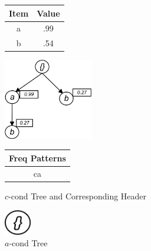 \begin{figure}
\begin{minipage}{0.15\textwidth}
  \centering
	\begin{center}
	\begin{tabular}{ |c|c| } 
 	\hline
 		Item&Value\\ \hline\hline
 		a &  .99  	\\ \hline
 		b &  .54   	\\ \hline
\end{tabular}
\end{center}  
\end{minipage}
  \hfill
\begin{minipage}{0.14\textwidth}
  \centering
  \hfill
  \includegraphics[width=.8\textwidth, height=3.5cm]{images/C_COND.jpg}
  \hfill  
\end{minipage}
\hfill
\begin{minipage}{0.15\textwidth}
  \centering  
	\begin{center}
	\begin{tabular}{ |c| } 
 	\hline
 		Freq Patterns \\ \hline\hline
 		ca  	\\ \hline
 		
\end{tabular}
\end{center}   
\end{minipage}
\caption{$c$-cond Tree and Corresponding Header}
\label{figure:c_cond}
\end{figure}
\begin{figure}
\centering
  \includegraphics[width=.05\textwidth, height=1.1cm]{images/A_COND.jpg}
\caption{$a$-cond Tree}
\label{figure:a_cond}
\end{figure}

%
